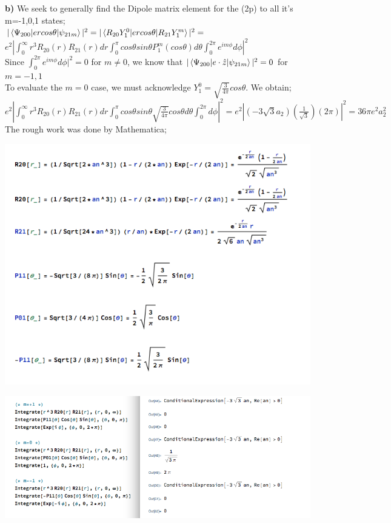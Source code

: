 \documentclass[10pt]{article}
\begin{document}
\textbf{b)} We seek to generally find the Dipole matrix element for the (2p) to all it's m=-1,0,1 states;\\

$|\braket{\Psi_{200}|ercos\theta|\psi_{21m}}|^2=|\braket{R_{20}Y_1^0|ercos\theta|R_{21}Y_1^m}|^2=$\\

$e^2| {\displaystyle\int_0^\infty}r^3R_{20}(r)R_{21}(r)dr {\displaystyle\int_0^\pi} cos\theta sin\theta P_1^m(cos\theta) d\theta {\displaystyle\int_0^{2\pi}}e^{im\phi}d\phi|^2$\\

Since  ${\displaystyle\int_0^{2\pi}}e^{im\phi}d\phi|^2=0$ for $m\neq0$, we know that $|\braket{\Psi_{200}|e\cdot\hat{z}|\psi_{21m}}|^2=0$ for $m=-1,1$\\

To evaluate the $m=0$ case, we must acknowledge $Y_1^0=\sqrt{\frac{3}{4\pi}}cos\theta$. We obtain;\\

$e^2| {\displaystyle\int_0^\infty}r^3R_{20}(r)R_{21}(r)dr {\displaystyle\int_0^\pi} cos\theta sin\theta \sqrt{\frac{3}{4\pi}}cos\theta d\theta {\displaystyle\int_0^{2\pi}}d\phi|^2=e^2|(-3\sqrt{3}a_2)(\frac{1}{\sqrt{3}})(2\pi)|^2=36\pi e^2 a_2^2$\\

The rough work was done by Mathematica;\\
\begin{center}
    \includegraphics[width=0.9\linewidth]{26fns.png}
\end{center}


\begin{center}
    \includegraphics[width=0.9\linewidth]{26ints.png}
\end{center}
\end{document}
